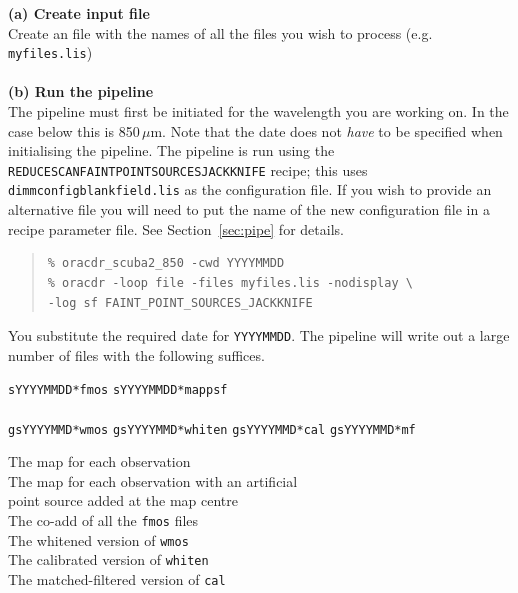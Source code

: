 \documentclass[twoside,11pt]{article}
\newcommand{\htmlref}[2]{#1}
\newcommand{\latexhtml}[2]{#1}
\newcommand{\xref}[3]{#1}
\renewcommand{\_}{\texttt{\symbol{95}}}
\newenvironment{myquote}{
   \color{MidnightBlue}\begin{quote}\begin{small}}{
   \end{small}\end{quote}
}
\newcommand{\drrecipe}[1]{\texttt{#1}}
\newcommand{\file}[1]{\texttt{#1}}
\newcommand{\cref}[3]{\latexhtml{#1~\ref{#2}}{\htmlref{#3}{#2}}}
\renewenvironment{myquote}{
      \begin{quote}\begin{small}}{
      \end{small}\end{quote}
   }
\begin{document}
\textbf{(a) Create input file}\\
Create an file with the names of all the files you wish to process (e.g.
\file{myfiles.lis})
\\ \\
\textbf{(b) Run the pipeline}\\
The pipeline must first be initiated for the wavelength you are
working on. In the case below this is 850\,$\mu$m. Note that the date
does not \emph{have} to be specified when initialising the pipeline.
The pipeline is run using the
\xref{\drrecipe{REDUCE\_SCAN\_FAINT\_POINT\_SOURCES\_JACKKNIFE}}{sun264}{REDUCE_SCAN_FAINT_POINT_SOURCES_JACKKNIFE}
recipe; this uses \file{dimmconfig\_blank\_field.lis} as the
configuration file. If you wish to provide an alternative file you
will need to put the name of the new configuration file in a recipe
parameter file.  See \cref{Section}{sec:pipe}{The SCUBA-2 Pipeline}
for details.
\begin{myquote}
\begin{verbatim}
% oracdr_scuba2_850 -cwd YYYYMMDD
% oracdr -loop file -files myfiles.lis -nodisplay \
-log sf FAINT_POINT_SOURCES_JACKKNIFE
\end{verbatim}
\end{myquote}

You substitute the required date for \texttt{YYYYMMDD}.
The pipeline will write out a large number of files with the following
suffices.

\begin{minipage}[t]{0.3\linewidth}
\file{sYYYYMMDD*\_fmos}
\file{sYYYYMMDD*\_mappsf}\\\\
\file{gsYYYYMMD*\_wmos}
\file{gsYYYYMMD*\_whiten}
\file{gsYYYYMMD*\_cal}
\file{gsYYYYMMD*\_mf}
\end{minipage}
\begin{minipage}[t]{0.7\linewidth}
The map for each observation\\
The map for each observation with an artificial\\point source added at the map centre\\
The co-add of all the \file{\_fmos} files\\
The whitened version of \file{\_wmos}\\
The calibrated version of \file{\_whiten}\\
The matched-filtered version of \file{\_cal}\\
\end{minipage}
\end{document}

